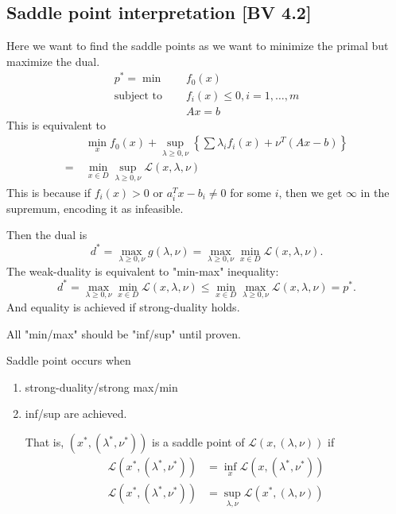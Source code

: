 \documentclass[class=article,crop=false]{standalone}
\begin{document}
\subsection{Saddle point interpretation [BV 4.2]}
Here we want to find the saddle points as we want to minimize the primal but maximize the dual.
\begin{align*}
	p^* = \min\quad &f_0(x)  \\
	\text{subject to } \quad &f_i(x) \leq 0, i = 1,\ldots,m  \\
&Ax = b  
\end{align*}
This is equivalent to
\begin{align*}
	&\min_{x}f_0(x) + \sup_{\lambda\geq 0, \nu}\left\{ \sum \lambda_i f_i(x) + \nu^{T} (Ax-b)\right\} \\
		 =\ & \min_{x \in D} \sup_{\lambda\geq 0, \nu} \mathscr{L}(x,\lambda,\nu)
\end{align*}
This is because if $ f_i(x)>0$ or  $ a_i^{T} x -b_i \neq 0$ for some $ i$, then we get  $ \infty$ in the supremum, encoding it as infeasible.

Then the dual is
\[
	d^* = \max_{\lambda\geq 0, \nu } g(\lambda,\nu) = \max_{\lambda\geq 0, \nu} \min_{x \in D} \mathscr{L}(x,\lambda,\nu)
.\] 
The weak-duality is equivalent to "min-max" inequality:
\[
	d^* =\max_{\lambda\geq 0,\nu} \min_{x \in D} \mathscr{L}(x,\lambda,\nu) \leq \min_{x \in D} \max_{\lambda\geq 0, \nu} \mathscr{L}(x,\lambda,\nu) = p^* 
.\]
And equality is achieved if strong-duality holds.
\begin{note}
All "min/max" should be "inf/sup" until proven.
\end{note}

\begin{thm}
Saddle point occurs when
\begin{enumerate}[label=(\arabic*)]
	\item strong-duality/strong max/min
	\item inf/sup are achieved.
		
		That is, $ (x^* ,(\lambda^* ,\nu^* ))$ is a saddle point of $ \mathscr{L}(x,(\lambda,\nu))$ if
		\begin{align*}
			\mathscr{L}(x^* ,(\lambda^* ,\nu^* )) &= \inf_x \mathscr{L}(x,(\lambda^* ,\nu^* )) \\
			\mathscr{L}(x^* ,(\lambda^* ,\nu^* )) &= \sup_{\lambda,\nu} \mathscr{L}(x^* ,(\lambda,\nu))
		\end{align*}
\end{enumerate}
\end{thm}
\end{document}

